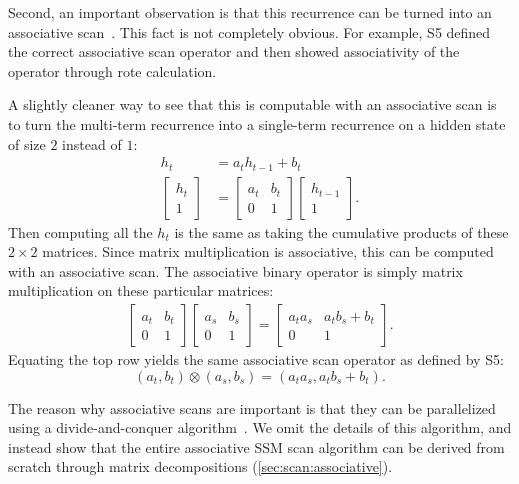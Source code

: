 \documentclass{article}
\newcommand{\citep}{\parencite}
\begin{document}
Second, an important observation is that this recurrence can be turned into an associative scan~\citep{martin2018parallelizing,smith2023s5}.
This fact is not completely obvious.
For example, S5 defined the correct associative scan operator and then showed associativity of the operator through rote calculation.

A slightly cleaner way to see that this is computable with an associative scan is to turn the multi-term recurrence into a single-term recurrence on a hidden state of size $2$ instead of $1$:
\begin{align*}
  h_t &= a_t h_{t-1} + b_t
  \\
  \begin{bmatrix} h_t \\ 1 \end{bmatrix}
      &=
  \begin{bmatrix}
    a_t & b_t \\ 0 & 1
  \end{bmatrix}
  \begin{bmatrix} h_{t-1} \\ 1 \end{bmatrix}
  .
\end{align*}
Then computing all the $h_t$ is the same as taking the cumulative products of these $2 \times 2$ matrices.
Since matrix multiplication is associative,
this can be computed with an associative scan.
The associative binary operator is simply matrix multiplication on these particular matrices:
\begin{align*}
  \begin{bmatrix}
    a_t & b_t \\ 0 & 1
  \end{bmatrix}
  \begin{bmatrix}
    a_s & b_s \\ 0 & 1
  \end{bmatrix}
  =
  \begin{bmatrix}
    a_ta_s & a_tb_s + b_t \\ 0 & 1
  \end{bmatrix}
  .
\end{align*}
Equating the top row yields the same associative scan operator as defined by S5:
\begin{equation}
  \label{eq:scan:associative-operator}
  (a_t, b_t) \otimes (a_s, b_s) = (a_ta_s, a_tb_s + b_t)
  .
\end{equation}

The reason why associative scans are important is that they can be parallelized using a divide-and-conquer algorithm~\citep{blelloch1990prefix}.
We omit the details of this algorithm, and instead show that the entire associative SSM scan algorithm can be derived from scratch through matrix decompositions (\cref{sec:scan:associative}).
\end{document}

